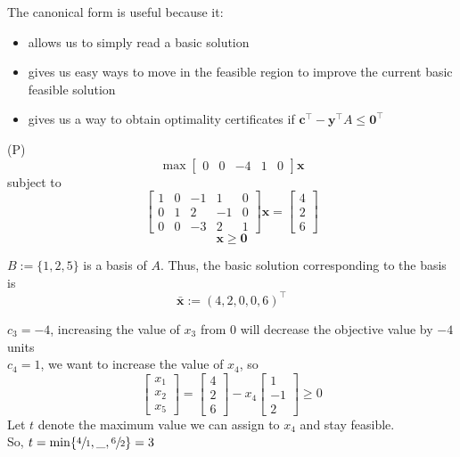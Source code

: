 The canonical form is useful because it:
\begin{itemize}
    \item allows us to simply read a basic solution
    \item gives us easy ways to move in the feasible region to improve the current basic
          feasible solution
    \item gives us a way to obtain optimality certificates if
          $\bm{c}^\top -\bm{y}^\top A\leqslant \bm{0}^\top $
\end{itemize}

\begin{exbox}
    \begin{example}
        (P)
        \[\max \begin{bmatrix}
                0 & 0 & -4 & 1 & 0
            \end{bmatrix}\bm{x}\]
        subject to
        \[
            \begin{bmatrix}
                1 & 0 & -1 & 1  & 0 \\
                0 & 1 & 2  & -1 & 0 \\
                0 & 0 & -3 & 2  & 1
            \end{bmatrix}\bm{x}
            =
            \begin{bmatrix}
                4 \\
                2 \\
                6
            \end{bmatrix} \]
        \[ \bm{x}\geqslant  \bm{0} \]

        $B:=\{1,2,5\}$ is a basis of $A$. Thus, the basic solution corresponding to the
        basis is
        \[\bm{\bar{x}}:=(4,2,0,0,6)^\top\]

        $c_3=-4$, increasing the value of $x_3$ from $0$ will decrease the objective value by $-4$ units\\
        $c_4=1$, we want to increase the value of $x_4$, so
        \[
            \begin{bmatrix}
                x_1 \\
                x_2 \\
                x_5
            \end{bmatrix}
            =
            \begin{bmatrix}
                4 \\
                2 \\
                6
            \end{bmatrix}
            -x_4
            \begin{bmatrix}
                1  \\
                -1 \\
                2
            \end{bmatrix}
            \geqslant  0
        \]
        Let $t$ denote the maximum value we can assign to $x_4$ and stay feasible.\\
        So,
        $t=\min\{\sfrac{4}{1},\_,\sfrac{6}{2}\}=3$
    \end{example}
\end{exbox}
